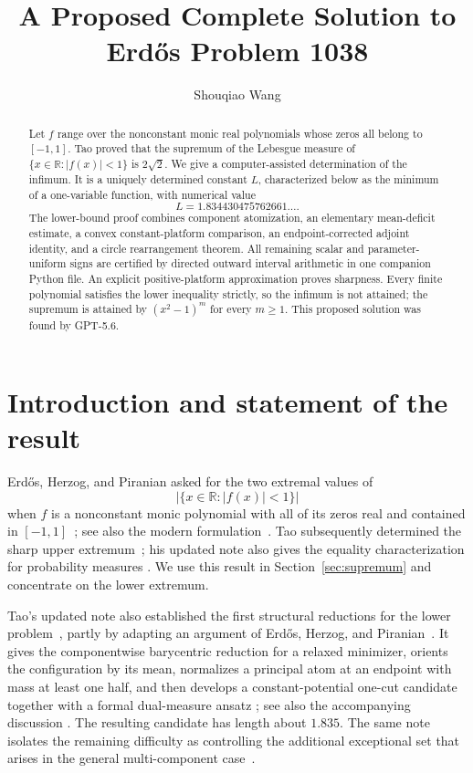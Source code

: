 \documentclass[11pt]{article}
\title{
A Proposed Complete Solution to Erd\H{o}s Problem 1038
}
\author{Shouqiao Wang}
\affil{Columbia University\hspace{2.5em}Multiscalar Intelligence}
\date{}
\numberwithin{equation}{section}
\theoremstyle{plain}
\theoremstyle{definition}
\theoremstyle{remark}
\newcommand{\R}{\mathbb R}
\newcommand{\1}{\mathbf 1}
\begin{document}
\maketitle

\begin{abstract}
Let $f$ range over the nonconstant monic real polynomials whose zeros all
belong to $[-1,1]$.  Tao proved that the supremum of the Lebesgue measure
of $\{x\in\R:|f(x)|<1\}$ is $2\sqrt2$.  We give a computer-assisted
determination of the infimum.  It is a uniquely determined constant $L$,
characterized below as the minimum of a one-variable function, with
numerical value
\[
 L=1.834430475762661\ldots.
\]
The lower-bound proof combines component atomization, an elementary
mean-deficit estimate, a convex constant-platform comparison, an
endpoint-corrected adjoint identity, and a circle rearrangement theorem.
All remaining scalar and parameter-uniform signs are certified by directed
outward interval arithmetic in one companion Python file.  An explicit
positive-platform approximation proves sharpness.  Every finite polynomial
satisfies the lower inequality strictly, so the infimum is not attained;
the supremum is attained by $(x^2-1)^m$ for every $m\ge1$.
This proposed solution was found by GPT-5.6.
\end{abstract}

\section{Introduction and statement of the result}

Erd\H{o}s, Herzog, and Piranian asked for the two extremal values of
\[
 \left|\{x\in\R:|f(x)|<1\}\right|
\]
when $f$ is a nonconstant monic polynomial with all of its zeros real and
contained in $[-1,1]$~\cite[p.~131]{EHP1958}; see also the modern
formulation~\cite{Bloom1038}.  Tao subsequently determined the sharp upper
extremum~\cite{Tao1038}; his updated note also gives the equality
characterization for probability measures
\cite[Theorem~2.1]{Tao1038Updated}.  We use this result in
Section~\ref{sec:supremum} and concentrate on the lower extremum.

Tao's updated note also established the first structural reductions for the
lower problem~\cite[Section~3]{Tao1038Updated}, partly by adapting an
argument of Erd\H{o}s, Herzog, and Piranian~\cite[Theorem~1]{EHP1958}.
It gives the componentwise barycentric reduction for a relaxed minimizer,
orients the configuration by its mean, normalizes a principal atom at an
endpoint with mass at least one half, and then develops a constant-potential
one-cut candidate together with a formal dual-measure ansatz
\cite[Section~4]{Tao1038Updated}; see also the accompanying discussion
\cite{Bloom1038Discussion}.  The resulting candidate has length about
$1.835$.  The same note isolates the remaining difficulty as controlling
the additional exceptional set that arises in the general multi-component
case~\cite[pp.~11--12]{Tao1038Updated}.
\end{document}
